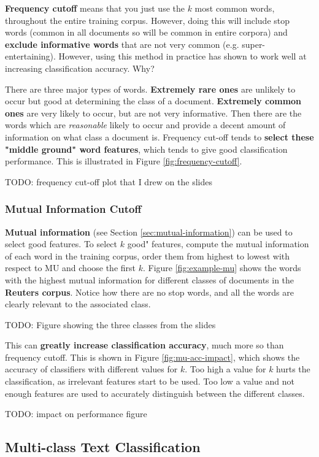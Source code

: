 \documentclass{article}
\begin{document}
\textbf{Frequency cutoff} means that you just use the $k$ most common words, throughout the entire training corpus. However, doing this will include stop words (common in all documents so will be common in entire corpora) and \textbf{exclude informative words} that are not very common (e.g. super-entertaining). However, using this method in practice has shown to work well at increasing classification accuracy. Why?

There are three major types of words. \textbf{Extremely rare ones} are unlikely to occur but good at determining the class of a document. \textbf{Extremely common ones} are very likely to occur, but are not very informative. Then there are the words which are \textit{reasonable} likely to occur and provide a decent amount of information on what class a document is. Frequency cut-off tends to \textbf{select these "middle ground" word features}, which tends to give good classification performance. This is illustrated in Figure \ref{fig:frequency-cutoff}.

TODO: frequency cut-off plot that I drew on the slides

\subsubsection{Mutual Information Cutoff}

\textbf{Mutual information} (see Section \ref{sec:mutual-information}) can be used to select good features. To select $k$ good" features, compute the mutual information of each word in the training corpus, order them from highest to lowest with respect to MU and choose the first $k$. Figure \ref{fig:example-mu} shows the words with the highest mutual information for different classes of documents in the \textbf{Reuters corpus}. Notice how there are no stop words, and all the words are clearly relevant to the associated class.

TODO: Figure showing the three classes from the slides

This can \textbf{greatly increase classification accuracy}, much more so than frequency cutoff. This is shown in Figure \ref{fig:mu-acc-impact}, which shows the accuracy of classifiers with different values for $k$. Too high a value for $k$ hurts the classification, as irrelevant features start to be used. Too low a value and not enough features are used to accurately distinguish between the different classes.

TODO: impact on performance figure

\subsection{Multi-class Text Classification}
\end{document}
